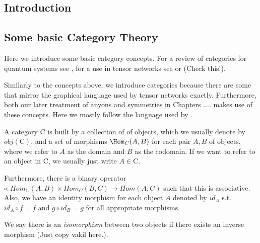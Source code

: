% 
% 

\subsection{Introduction}

\subsection{Some basic Category Theory}

Here we introduce some basic category concepts. For a review of categories for quantum systems see \cite{selingerSurveyGraphicalLanguages2011}, for a use in tensor networks see \cite{vercleyenMathematicalStructureTensor2018} or \cite{biamonteLecturesQuantumTensor2020}(Check this!).

Similarly to the concepts above, we introduce categories because there are some that mirror the graphical language used by tensor networks exactly. Furthermore, both our later treatment of anyons and symmetries in Chapters .... makes use of these concepts. Here we mostly follow the language used by \cite{VakilRisingSea2025}.

\begin{definition}[Category]
  \label{def:category}
  A category $\mathrm{C} $  is built by a collection of of objects, which we usually denote by $obj(\mathrm{C} )$, and a set of morphisms $\Hom_C(A,B)$ for each pair $A,B$ of objects, where we refer to $A$ as the domain and $B$ as the codomain. If we want to refer to an object in $\mathrm{C} $, we usually just write $A \in \mathrm{C}$.

  Furthermore, there is a binary operator $\circ : Hom_C(A,B) \times Hom_C(B, C) \to Hom(A,C)$ such that this is associative. Also, we have an identity morphism for each object $A$ denoted by $id_A$ s.t. $id_A \circ f = f$ and $g \circ id_B = g$ for all appropriate morphisms. 

  We say there is an \emph{isomorphism} between two objects if there exists an inverse morphism (Just copy vakil here.).
\end{definition}

